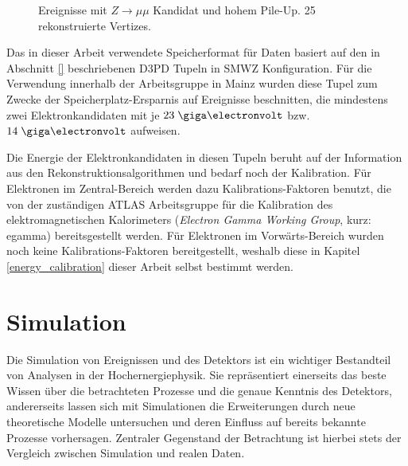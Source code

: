 \begin{figure}
\begin{minipage}[b]{0.48\textwidth}
        \captionsetup{format=plain}
        \caption{Ereignisse mit $Z \rightarrow \mu\mu$ Kandidat und hohem
            Pile-Up. 25 rekonstruierte Vertizes.}
        \label{fig:pileup}
    \end{minipage}
\end{figure}

Das in dieser Arbeit verwendete Speicherformat für Daten basiert auf den in
Abschnitt \ref{} beschriebenen D3PD Tupeln in SMWZ Konfiguration. Für die
Verwendung innerhalb der Arbeitsgruppe in Mainz wurden diese Tupel zum Zwecke
der Speicherplatz-Ersparnis auf Ereignisse beschnitten, die mindestens zwei
Elektronkandidaten mit je $23 \GeV$ bzw. $14 \GeV$ aufweisen.

Die Energie der Elektronkandidaten in diesen Tupeln beruht auf der Information
aus den Rekonstruktionsalgorithmen und bedarf noch der Kalibration. Für
Elektronen im Zentral-Bereich werden dazu Kalibrations-Faktoren benutzt, die
von der zuständigen ATLAS Arbeitsgruppe für die Kalibration des
elektromagnetischen Kalorimeters (\textit{Electron Gamma Working Group}, kurz:
egamma) bereitsgestellt werden. Für Elektronen im Vorwärts-Bereich wurden noch
keine Kalibrations-Faktoren bereitgestellt, weshalb diese in Kapitel
\ref{energy_calibration} dieser Arbeit selbst bestimmt werden.


\section{Simulation}
\label{data_sim_selection:simulation}


Die Simulation von Ereignissen und des Detektors ist ein wichtiger Bestandteil
von Analysen in der Hochernergiephysik. Sie repräsentiert einerseits das
beste Wissen über die betrachteten Prozesse und die genaue Kenntnis des
Detektors, andererseits lassen sich mit Simulationen die Erweiterungen durch
neue theoretische Modelle untersuchen und deren Einfluss auf bereits bekannte
Prozesse vorhersagen. Zentraler Gegenstand der Betrachtung ist hierbei stets
der Vergleich zwischen Simulation und realen Daten.



